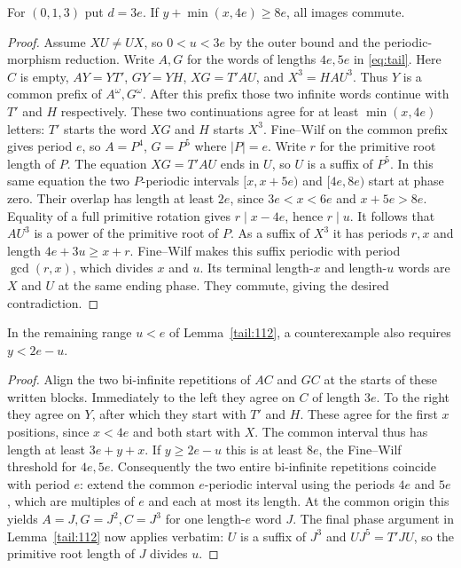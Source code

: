 \begin{lemma}\label{tail:013}
For $(0,1,3)$ put $d=3e$. If $y+\min(x,4e)\ge8e$, all images
commute.
\end{lemma}
\begin{proof}
Assume $XU\ne UX$, so $0<u<3e$ by the outer bound and the
periodic-morphism reduction. Write $A,G$ for the words of lengths
$4e,5e$ in \eqref{eq:tail}. Here $C$ is empty,
$AY=YT'$, $GY=YH$, $XG=T'AU$, and $X^3=HAU^3$.
Thus $Y$ is a common prefix of $A^\omega,G^\omega$. After this
prefix those two infinite words continue with $T'$ and $H$
respectively. These two continuations agree for at least
$\min(x,4e)$ letters: $T'$ starts the word $XG$ and $H$ starts
$X^3$. Fine--Wilf on the common prefix gives period $e$, so
$A=P^4$, $G=P^5$ where $|P|=e$. Write $r$ for the primitive
root length of $P$. The equation $XG=T'AU$ ends in $U$, so
$U$ is a suffix of $P^5$. In this same equation the two
$P$-periodic intervals $[x,x+5e)$ and $[4e,8e)$ start at phase zero.
Their overlap has length at least $2e$, since $3e<x<6e$ and
$x+5e>8e$. Equality of a full primitive rotation gives $r\mid x-4e$,
hence $r\mid u$. It follows that $AU^3$ is a power of the primitive
root of $P$. As a suffix of $X^3$ it has periods $r,x$ and length
$4e+3u\ge x+r$. Fine--Wilf makes this suffix periodic with period
$\gcd(r,x)$, which divides $x$ and $u$. Its terminal length-$x$
and length-$u$ words are $X$ and $U$ at the same ending phase.
They commute, giving the desired contradiction.
\end{proof}

\begin{corollary}
In the remaining range $u<e$ of Lemma~\ref{tail:112}, a
counterexample also requires $y<2e-u$.
\end{corollary}
\begin{proof}
Align the two bi-infinite repetitions of $AC$ and $GC$ at the starts
of these written blocks. Immediately to the left they agree on $C$
of length $3e$. To the right they agree on $Y$, after which they
start with $T'$ and $H$. These agree for the first $x$ positions,
since $x<4e$ and both start with $X$. The common interval thus has
length at least $3e+y+x$. If $y\ge2e-u$ this is at least $8e$,
the Fine--Wilf threshold for $4e,5e$. Consequently the two entire
bi-infinite repetitions coincide with period $e$: extend the common
$e$-periodic interval using the periods $4e$ and $5e$, which are
multiples of $e$ and each at most its length. At the common origin
this yields $A=J,G=J^2,C=J^3$ for one length-$e$ word $J$.
The final phase argument in Lemma~\ref{tail:112} now applies verbatim:
$U$ is a suffix of $J^3$ and $UJ^5=T'JU$, so the primitive root
length of $J$ divides $u$.
\end{proof}


